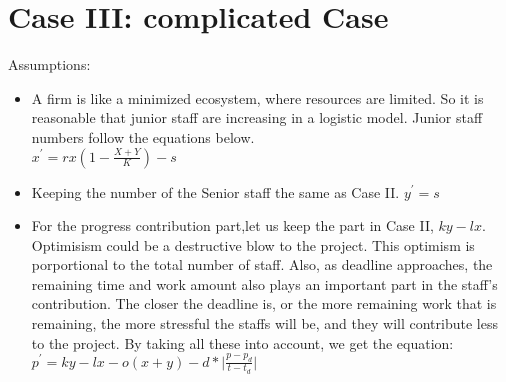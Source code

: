 \documentclass{article}
\newenvironment{atomize}
    {\begin{list} {} {
            \setlength\itemindent{0pt}
            \setlength\leftmargin{10pt}
            \setlength\labelwidth{0pt}
    }}
    {\end{list}}
\begin{document}
  \section*{Case III: complicated Case}
  	\begin{atomize}
  		\item Assumptions:
  			\begin{itemize}
    			\item A firm is like a minimized ecosystem, where resources are limited. So it is reasonable that junior staff are increasing in a logistic model. Junior staff numbers follow the equations below. \\ $x^{\prime} = rx(1-\frac{X+Y}{K}) - s$
    			
          \item Keeping the number of the Senior staff the same as Case II. $y^{\prime} = s$

    			\item For the progress contribution part,let us keep the part in Case II, $ky-lx$. Optimisism could be a destructive blow to the project. This optimism is porportional to the total number of staff. Also, as deadline approaches, the remaining time and work amount also plays an important part in the staff's contribution. The closer the deadline is, or the more remaining work that is remaining, the more stressful the staffs will be, and they will contribute less to the project. By taking all these into account, we get the equation: \\
    				$p^{\prime} = ky-lx-o(x+y)-d*\lvert\frac{p-p_{d}}{t-t_{d}}\rvert$
  			\end{itemize}
  	\end{atomize}
\end{document}
